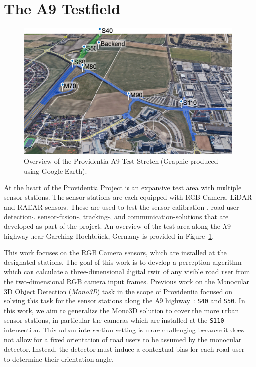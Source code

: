 
\section{The A9 Testfield}
\label{sec:a9testfield}

\begin{figure}[htb]
    \includegraphics[width=\linewidth]{figures/teststrecke-gesamt}
    \caption{Overview of the Providentia A9 Test Stretch (Graphic produced using Google Earth).}
    \label{fig:providentia-test-area}
\end{figure}

At the heart of the Providentia Project is an expansive test area with multiple sensor stations.
The sensor stations are each equipped with RGB Camera, LiDAR and RADAR sensors.
These are used to test the sensor calibration-, road user detection-, sensor-fusion-, tracking-, and communication-solutions that are developed as part of the project.
An overview of the test area along the A9 highway near Garching Hochbrück, Germany is provided in Figure~\ref{fig:providentia-test-area}.

This work focuses on the RGB Camera sensors, which are installed at the designated stations.
The goal of this work is to develop a perception algorithm which can calculate a three-dimensional digital twin of any visible road user from the two-dimensional RGB camera input frames.
Previous work on the Monocular 3D Object Detection (\textit{Mono3D}) task in the scope of Providentia focused on solving this task for the sensor stations along the A9 highway~\cite{leonthesis}: \texttt{S40} and \texttt{S50}.
In this work, we aim to generalize the Mono3D solution to cover the more urban sensor stations, in particular the cameras which are installed at the \texttt{S110} intersection.
This urban intersection setting is more challenging because it does not allow for a fixed orientation of road users to be assumed by the monocular detector.
Instead, the detector must induce a contextual bias for each road user to determine their orientation angle.


